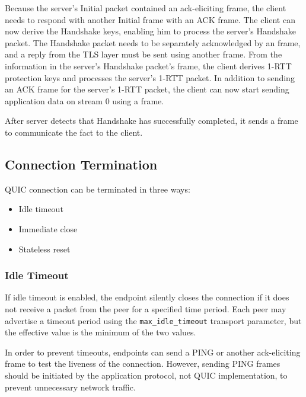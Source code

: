 Because the server's Initial packet contained an ack-eliciting \CRYPTO{} frame, the client needs to
respond with another Initial frame with an ACK frame. The client can now derive the Handshake keys,
enabling him to process the server's Handshake packet. The Handshake packet needs to be separately
acknowledged by an \ACK{} frame, and a reply from the TLS layer must be sent using another \CRYPTO{}
frame. From the information in the server's Handshake packet's \CRYPTO{} frame, the client derives
1-RTT protection keys and processes the server's 1-RTT packet. In addition to sending an ACK frame
for the server's 1-RTT packet, the client can now start sending application data on stream 0 using a
\STREAM{} frame.

After server detects that Handshake has successfully completed, it sends a \HANDSHAKEDONE{} frame to
communicate the fact to the client.

\subsection{Connection Termination}

QUIC connection can be terminated in three ways:

\begin{itemize}

  \item Idle timeout

  \item Immediate close

  \item Stateless reset

\end{itemize}

\subsubsection{Idle Timeout}\label{sec:idle-timeout}

If idle timeout is enabled, the endpoint silently closes the connection if it does not receive a
packet from the peer for a specified time period. Each peer may advertise a timeout period using the
\texttt{max\_idle\_timeout} transport parameter, but the effective value is the minimum of the two
values.

In order to prevent timeouts, endpoints can send a PING or another ack-eliciting frame to test the
liveness of the connection. However, sending PING frames should be initiated by the application
protocol, not QUIC implementation, to prevent unnecessary network traffic.

